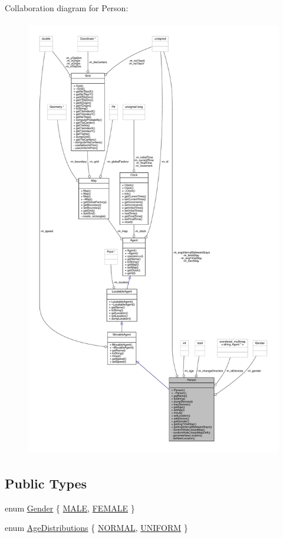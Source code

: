 Collaboration diagram for Person\+:\nopagebreak
\begin{figure}[H]
\begin{center}
\leavevmode
\includegraphics[height=550pt]{class_person__coll__graph}
\end{center}
\end{figure}
\subsection*{Public Types}
\begin{DoxyCompactItemize}
\item 
enum \mbox{\hyperlink{class_person_aff84ca16bd4dbf364614d86f20b29dd2}{Gender}} \{ \mbox{\hyperlink{class_person_aff84ca16bd4dbf364614d86f20b29dd2a16691f7cc6595f87b71d9b43ad23fcb4}{M\+A\+LE}}, 
\mbox{\hyperlink{class_person_aff84ca16bd4dbf364614d86f20b29dd2a8ee21010fb2d8e8794ef72be368da064}{F\+E\+M\+A\+LE}}
 \}
\item 
enum \mbox{\hyperlink{class_person_a53376a9a5852ec7760488a01c37f0b0b}{Age\+Distributions}} \{ \mbox{\hyperlink{class_person_a53376a9a5852ec7760488a01c37f0b0ba7e4e1da74c9858476e0149deef9458c4}{N\+O\+R\+M\+AL}}, 
\mbox{\hyperlink{class_person_a53376a9a5852ec7760488a01c37f0b0ba4cf35976a167c4ac001a3eed2920a9b0}{U\+N\+I\+F\+O\+RM}}
 \}
\end{DoxyCompactItemize}
